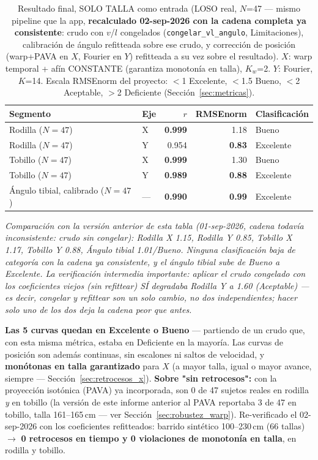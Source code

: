 \documentclass[11pt,a4paper]{scrartcl}
\begin{document}
\begin{table}[H]
\centering
\caption{Resultado final, SOLO TALLA como entrada (LOSO real, $N$=47 --- mismo pipeline que la app, \textbf{recalculado 02-sep-2026 con la cadena completa ya consistente}: crudo con $v$/$l$ congelados (\texttt{congelar\_vl\_angulo}, Limitaciones), calibración de ángulo refitteada sobre ese crudo, y corrección de posición (warp+PAVA en $X$, Fourier en $Y$) refitteada a su vez sobre el resultado). $X$: warp temporal + afín CONSTANTE (garantiza monotonía en talla), $K_w$=2. $Y$: Fourier, $K$=14. Escala RMSEnorm del proyecto: $<$1 Excelente, $<$1.5 Bueno, $<$2 Aceptable, $>$2 Deficiente (Sección~\ref{sec:metricas}).}
\label{tab:resultados_finales}
\small
\begin{tabular}{@{}llrrl@{}}
\toprule
Segmento & Eje & $r$ & RMSEnorm & Clasificación \\
\midrule
Rodilla ($N=47$) & X & \textbf{0.999} & 1.18 & Bueno \\
Rodilla ($N=47$) & Y & 0.954 & \textbf{0.83} & Excelente \\
Tobillo ($N=47$) & X & \textbf{0.999} & 1.30 & Bueno \\
Tobillo ($N=47$) & Y & \textbf{0.989} & \textbf{0.88} & Excelente \\
\midrule
Ángulo tibial, calibrado ($N=47$) & --- & \textbf{0.990} & \textbf{0.99} & Excelente \\
\bottomrule
\end{tabular}
\end{table}

\textit{Comparación con la versión anterior de esta tabla (01-sep-2026, cadena todavía inconsistente: crudo sin congelar): Rodilla X 1.15, Rodilla Y 0.85, Tobillo X 1.17, Tobillo Y 0.88, Ángulo tibial 1.01/Bueno. Ninguna clasificación baja de categoría con la cadena ya consistente, y el ángulo tibial sube de Bueno a Excelente. La verificación intermedia importante: aplicar el crudo congelado con los coeficientes viejos (sin refittear) SÍ degradaba Rodilla Y a 1.60 (Aceptable) --- es decir, congelar y refittear son un solo cambio, no dos independientes; hacer solo uno de los dos deja la cadena peor que antes.}

\textbf{Las 5 curvas quedan en Excelente o Bueno} --- partiendo de un crudo que, con esta misma métrica, estaba en Deficiente en la mayoría. Las curvas de posición son además continuas, sin escalones ni saltos de velocidad, y \textbf{monótonas en talla garantizado} para $X$ (a mayor talla, igual o mayor avance, siempre --- Sección~\ref{sec:retrocesos_x}). \textbf{Sobre "sin retrocesos":} con la proyección isotónica (PAVA) ya incorporada, son 0 de 47 sujetos reales en rodilla \emph{y} en tobillo (la versión de este informe anterior al PAVA reportaba 3 de 47 en tobillo, talla 161--165\,cm --- ver Sección~\ref{sec:robustez_warp}). Re-verificado el 02-sep-2026 con los coeficientes refitteados: barrido sintético 100--230\,cm (66 tallas) $\to$ \textbf{0 retrocesos en tiempo y 0 violaciones de monotonía en talla}, en rodilla y tobillo.
\end{document}
